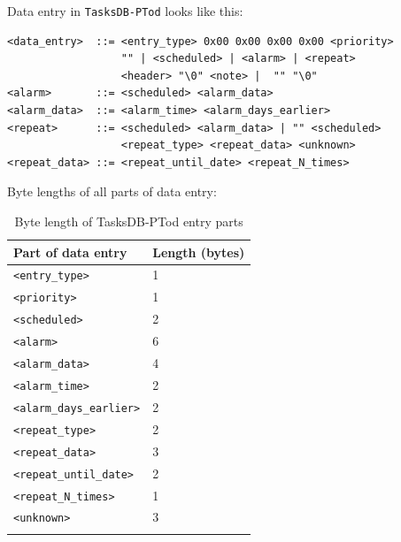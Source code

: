 \documentclass[a4paper,12pt,oneside]{scrartcl}
\begin{document}
Data entry in \texttt{TasksDB-PTod} looks like this:
\begin{verbatim}
<data_entry>  ::= <entry_type> 0x00 0x00 0x00 0x00 <priority>
                  "" | <scheduled> | <alarm> | <repeat>
                  <header> "\0" <note> |  "" "\0"
<alarm>       ::= <scheduled> <alarm_data>
<alarm_data>  ::= <alarm_time> <alarm_days_earlier>
<repeat>      ::= <scheduled> <alarm_data> | "" <scheduled>
                  <repeat_type> <repeat_data> <unknown>
<repeat_data> ::= <repeat_until_date> <repeat_N_times>
\end{verbatim}

Byte lengths of all parts of data entry:
\begin{longtable}[H]{|l|l|}
  \hline
  \textbf{Part of data entry} & \textbf{Length (bytes)} \\
  \hline
  \texttt{<entry\_type>} & 1 \\
  \hline
  \texttt{<priority>} & 1 \\
  \hline
  \texttt{<scheduled>} & 2 \\
  \hline
  \texttt{<alarm>} & 6 \\
  \texttt{<alarm\_data>} & 4 \\
  \texttt{<alarm\_time>} & 2 \\
  \texttt{<alarm\_days\_earlier>} & 2 \\
  \hline
  \texttt{<repeat\_type>} & 2 \\
  \texttt{<repeat\_data>} & 3 \\
  \texttt{<repeat\_until\_date>} & 2 \\
  \texttt{<repeat\_N\_times>} & 1 \\
  \texttt{<unknown>} & 3 \\
  \hline
  \caption{Byte length of TasksDB-PTod entry parts}
  \label{tab:tasks-ptod-entry-parts-lens}
\end{longtable}
\end{document}
